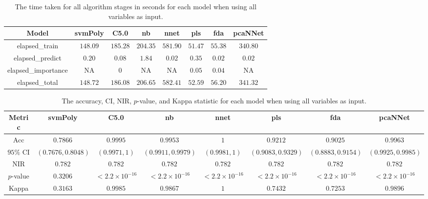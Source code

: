 \begin{table}[!ht]
	\centering
	\begin{tabular}{|c|c|c|c|c|c|c|c|}
		\hline
		Model & svmPoly & C5.0 & nb & nnet & pls & fda & pcaNNet \\ \hline
		elapsed_train & $148.09$ & $185.28$ & $204.35$ & $581.90$ & $51.47$ & $55.38$ & $340.80$ \\ \hline
		elapsed_predict & $0.20$ & $0.08$ & $1.84$ & $0.02$ & $0.35$ & $0.02$ & $0.02$ \\ \hline
		elapsed_importance & NA & $0$ & NA & NA & $0.05$ & $0.04$ & NA \\ \hline
		elapsed_total & $148.72$ & $186.08$ & $206.65$ & $582.41$ & $52.59$ & $56.20$ & $341.32$ \\ \hline
	\end{tabular}
	\caption{The time taken for all algorithm stages in seconds for each model when using all variables as input.}
	\label{tab:time:reverse:all}
\end{table}

\begin{table}[!ht]
	\centering
	\begin{tabular}{|c|c|c|c|c|c|c|c|}
		\hline
		Metric & svmPoly & C5.0 & nb & nnet & pls & fda & pcaNNet \\ \hline
		Acc & $0.7866$ & $0.9995$ & $0.9953$ & $1$ & $0.9212$ & $0.9025$ & $0.9963$ \\ \hline
		$95\%$ CI & $(0.7676, 0.8048)$ & $(0.9971, 1)$ & $(0.9911, 0.9979)$ & $(0.9981, 1)$ & $(0.9083, 0.9329)$ & $(0.8883, 0.9154)$ & $(0.9925, 0.9985)$ \\ \hline
		NIR & $0.782$ & $0.782$ & $0.782$ & $0.782$ & $0.782$ & $0.782$ & $0.782$ \\ \hline
		$p$-value & $0.3206$ & $< 2.2 \times {10}^{-16}$ & $< 2.2 \times {10}^{-16}$ & $< 2.2 \times {10}^{-16}$ & $< 2.2 \times {10}^{-16}$ & $< 2.2 \times {10}^{-16}$ & $< 2.2 \times {10}^{-16}$ \\ \hline
		Kappa & $0.3163$ & $0.9985$ & $0.9867$ & $1$ & $0.7432$ & $0.7253$ & $0.9896$ \\ \hline
	\end{tabular}
	\caption{The accuracy, CI, NIR, $p$-value, and Kappa statistic for each model when using all variables as input.}
	\label{tab:stats:all}
\end{table}

